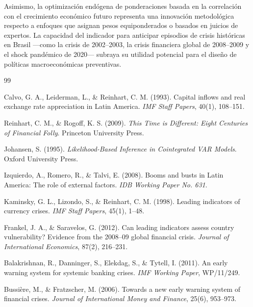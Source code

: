 \documentclass[12pt]{article}
\begin{document}
Asimismo, la optimización endógena de ponderaciones basada en la correlación con el crecimiento económico futuro representa una innovación metodológica respecto a enfoques que asignan pesos equiponderados o basados en juicios de expertos. La capacidad del indicador para anticipar episodios de crisis históricas en Brasil —como la crisis de 2002--2003, la crisis financiera global de 2008--2009 y el shock pandémico de 2020— subraya su utilidad potencial para el diseño de políticas macroeconómicas preventivas.

\newpage
\begin{thebibliography}{99}

Calvo, G. A., Leiderman, L., \& Reinhart, C. M. (1993). Capital inflows and real exchange rate appreciation in Latin America. \textit{IMF Staff Papers}, 40(1), 108--151.

Reinhart, C. M., \& Rogoff, K. S. (2009). \textit{This Time is Different: Eight Centuries of Financial Folly}. Princeton University Press.

Johansen, S. (1995). \textit{Likelihood-Based Inference in Cointegrated VAR Models}. Oxford University Press.

Izquierdo, A., Romero, R., \& Talvi, E. (2008). Booms and busts in Latin America: The role of external factors. \textit{IDB Working Paper No. 631}.

Kaminsky, G. L., Lizondo, S., \& Reinhart, C. M. (1998). Leading indicators of currency crises. \textit{IMF Staff Papers}, 45(1), 1--48.

Frankel, J. A., \& Saravelos, G. (2012). Can leading indicators assess country vulnerability? Evidence from the 2008--09 global financial crisis. \textit{Journal of International Economics}, 87(2), 216--231.

Balakrishnan, R., Danninger, S., Elekdag, S., \& Tytell, I. (2011). An early warning system for systemic banking crises. \textit{IMF Working Paper}, WP/11/249.

Bussière, M., \& Fratzscher, M. (2006). Towards a new early warning system of financial crises. \textit{Journal of International Money and Finance}, 25(6), 953--973.

\end{thebibliography}
\end{document}
